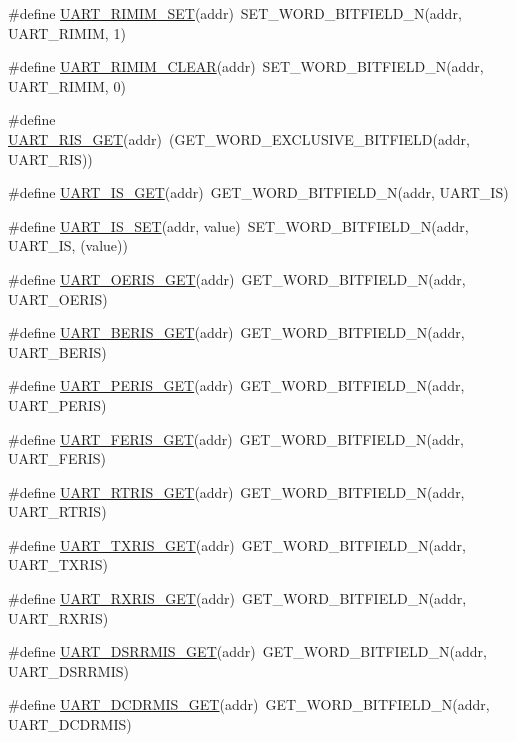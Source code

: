\begin{DoxyCompactItemize}
\item 
\#define \hyperlink{a00574_a4bc5f6d434ec2f458aae73e01cbc996e}{UART\_\-RIMIM\_\-SET}(addr)~SET\_\-WORD\_\-BITFIELD\_\-N(addr, UART\_\-RIMIM, 1)
\item 
\#define \hyperlink{a00574_a5e20ab421499418ea6163602faffc670}{UART\_\-RIMIM\_\-CLEAR}(addr)~SET\_\-WORD\_\-BITFIELD\_\-N(addr, UART\_\-RIMIM, 0)
\item 
\#define \hyperlink{a00574_a3aa030fc86cba2342e11f303387c7c72}{UART\_\-RIS\_\-GET}(addr)~(GET\_\-WORD\_\-EXCLUSIVE\_\-BITFIELD(addr, UART\_\-RIS))
\item 
\#define \hyperlink{a00574_a23932a287037838eea3947d6947fa4ca}{UART\_\-IS\_\-GET}(addr)~GET\_\-WORD\_\-BITFIELD\_\-N(addr, UART\_\-IS)
\item 
\#define \hyperlink{a00574_aaaed4c92076b7668406ffd76a535f74c}{UART\_\-IS\_\-SET}(addr, value)~SET\_\-WORD\_\-BITFIELD\_\-N(addr, UART\_\-IS, (value))
\item 
\#define \hyperlink{a00574_abd67135524d46ce6e12d64586411dd7a}{UART\_\-OERIS\_\-GET}(addr)~GET\_\-WORD\_\-BITFIELD\_\-N(addr, UART\_\-OERIS)
\item 
\#define \hyperlink{a00574_a87c63bf98689fe1d6611c0db2019be8f}{UART\_\-BERIS\_\-GET}(addr)~GET\_\-WORD\_\-BITFIELD\_\-N(addr, UART\_\-BERIS)
\item 
\#define \hyperlink{a00574_a8ee607fae24b6c224644ac590d2d5297}{UART\_\-PERIS\_\-GET}(addr)~GET\_\-WORD\_\-BITFIELD\_\-N(addr, UART\_\-PERIS)
\item 
\#define \hyperlink{a00574_a88473271ee7f6c673d16bec62e8c2edf}{UART\_\-FERIS\_\-GET}(addr)~GET\_\-WORD\_\-BITFIELD\_\-N(addr, UART\_\-FERIS)
\item 
\#define \hyperlink{a00574_a89b823686f833500ef5044a2d7abacd9}{UART\_\-RTRIS\_\-GET}(addr)~GET\_\-WORD\_\-BITFIELD\_\-N(addr, UART\_\-RTRIS)
\item 
\#define \hyperlink{a00574_a953f50feb39157ec4fb9fadb8d2bf4f5}{UART\_\-TXRIS\_\-GET}(addr)~GET\_\-WORD\_\-BITFIELD\_\-N(addr, UART\_\-TXRIS)
\item 
\#define \hyperlink{a00574_a59c19cf9c7ed304e67e9b10c089ea65e}{UART\_\-RXRIS\_\-GET}(addr)~GET\_\-WORD\_\-BITFIELD\_\-N(addr, UART\_\-RXRIS)
\item 
\#define \hyperlink{a00574_a9e46034f883cff218a4c8239deb2e4af}{UART\_\-DSRRMIS\_\-GET}(addr)~GET\_\-WORD\_\-BITFIELD\_\-N(addr, UART\_\-DSRRMIS)
\item 
\#define \hyperlink{a00574_a3429fb5e1490462ebe55e2e7b152d740}{UART\_\-DCDRMIS\_\-GET}(addr)~GET\_\-WORD\_\-BITFIELD\_\-N(addr, UART\_\-DCDRMIS)

\end{DoxyCompactItemize}
